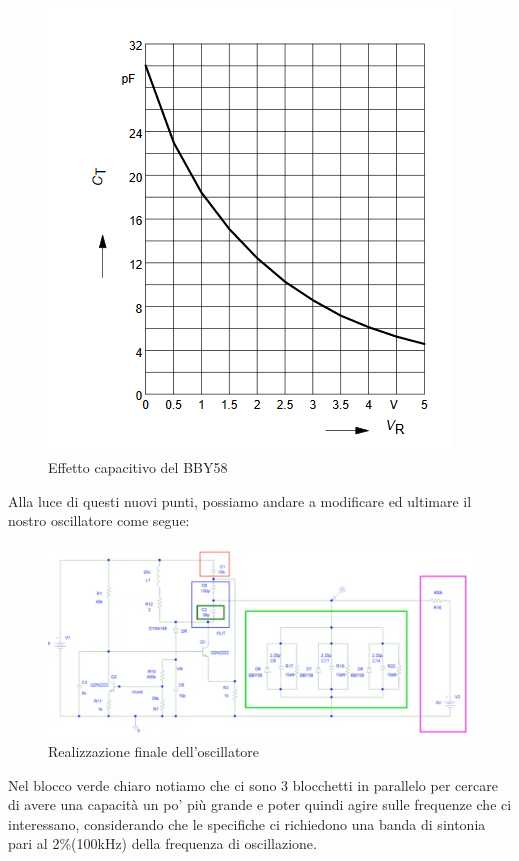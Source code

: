 \documentclass{article}
\begin{document}
~\begin{figure}[H]
\includegraphics[width=\textwidth]{BBY58.png}
\centering
\caption{Effetto capacitivo del BBY58}
\label{fig:foo}
\end{figure}
Alla luce di questi nuovi punti, possiamo andare a modificare ed ultimare il nostro oscillatore come segue:
~\begin{figure}[H]
\includegraphics[width=\textwidth]{UltimoOscillatore.png}
\centering
\caption{Realizzazione finale dell'oscillatore}
\label{fig:foo}
\end{figure}
Nel blocco verde chiaro notiamo che ci sono 3 blocchetti in parallelo per cercare di avere una capacità un po' più grande e poter quindi agire sulle frequenze che ci interessano, considerando che le specifiche ci richiedono una banda di sintonia pari al 2\%(100kHz) della frequenza di oscillazione.
\end{document}
